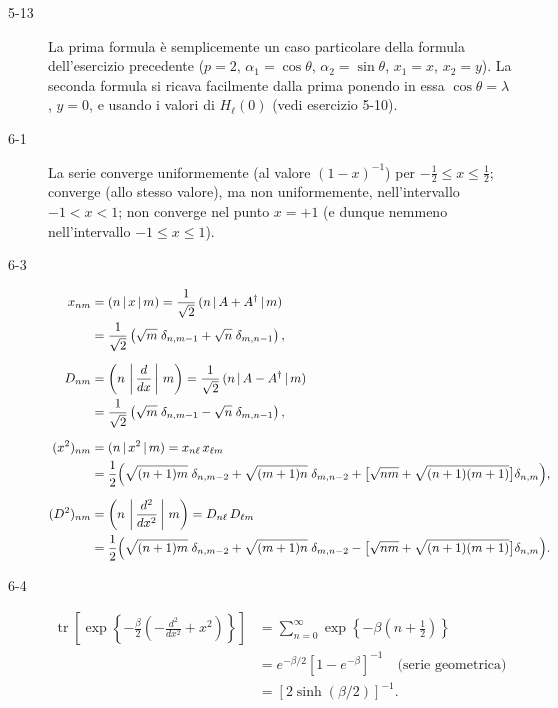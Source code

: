 \documentclass[11pt, a4paper]{book}
\numberwithin{equation}{section}
\begin{document}
\begin{description}
\item[5-13] La prima formula è semplicemente un caso particolare della formula dell'esercizio precedente ($p=2$, $\alpha_1=\cos\theta$, $\alpha_2=\sin\theta$, $x_1=x$, $x_2=y$). La seconda formula si ricava facilmente dalla prima ponendo in essa $\cos\theta = \lambda$, $y=0$, e usando i valori di $H_\ell(0)$ (vedi esercizio 5-10).

\item[6-1] La serie converge uniformemente (al valore $(1-x)^{-1}$) per $-\frac{1}{2}\leq x \leq \frac{1}{2}$; converge (allo stesso valore), ma non uniformemente, nell'intervallo $-1<x<1$; non converge nel punto $x=+1$ (e dunque nemmeno nell'intervallo $-1\leq x\leq 1$).

\item[6-3]
\begin{align*}
  x_{nm} &= (n\,|\,x\,|\,m) = \frac{1}{\sqrt{2}}\,(n\,|\,A+A^\dagger\,|\,m)\\
  &= \frac{1}{\sqrt{2}}\left(\sqrt{m}\;\delta_{n,m-1} + \sqrt{n}\;\delta_{m,n-1}\right),\\[6pt]
  D_{nm} &= \left(n\,\left|\,\frac{d}{dx}\,\right|\,m\right) = \frac{1}{\sqrt{2}}\,(n\,|\,A-A^\dagger\,|\,m)\\
  &= \frac{1}{\sqrt{2}}\left(\sqrt{m}\;\delta_{n,m-1} - \sqrt{n}\;\delta_{m,n-1}\right),\\[6pt]
  (x^2)_{nm} &= (n\,|\,x^2\,|\,m) = x_{n\ell}\,x_{\ell m}\\
  &= \frac{1}{2}\Bigl(\sqrt{(n+1)m}\;\delta_{n,m-2} + \sqrt{(m+1)n}\;\delta_{m,n-2}
    + \bigl[\sqrt{nm}+\sqrt{(n+1)(m+1)}\bigr]\delta_{n,m}\Bigr),\\[6pt]
  (D^2)_{nm} &= \left(n\,\left|\,\frac{d^2}{dx^2}\,\right|\,m\right) = D_{n\ell}\,D_{\ell m}\\
  &= \frac{1}{2}\Bigl(\sqrt{(n+1)m}\;\delta_{n,m-2} + \sqrt{(m+1)n}\;\delta_{m,n-2}
    - \bigl[\sqrt{nm}+\sqrt{(n+1)(m+1)}\bigr]\delta_{n,m}\Bigr).
\end{align*}

\item[6-4]
\begin{align*}
  \operatorname{tr}\!\left[\exp\!\left\{-\frac{\beta}{2}\!\left(-\frac{d^2}{dx^2}+x^2\right)\right\}\right]
  &= \sum_{n=0}^{\infty} \exp\!\left\{-\beta\!\left(n+\tfrac{1}{2}\right)\right\}\\
  &= e^{-\beta/2}\left[1-e^{-\beta}\right]^{-1}
    \quad\text{(serie geometrica)}\\
  &= \left[2\sinh(\beta/2)\right]^{-1}.
\end{align*}


\end{description}
\end{document}
